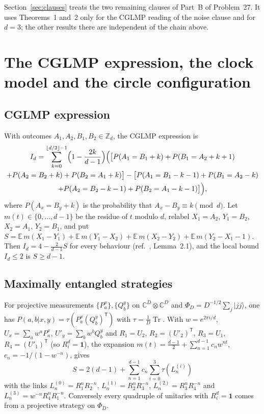 \documentclass[11pt]{amsart}
\theoremstyle{definition}
\theoremstyle{remark}
\numberwithin{equation}{section}
\newcommand{\C}{\mathbb{C}}
\newcommand{\Z}{\mathbb{Z}}
\newcommand{\Tr}{\operatorname{Tr}}
\newcommand{\one}{\mathbf{1}}
\begin{document}
Section~\ref{sec:clauses} treats the two remaining clauses of Part~B of Problem~27. It uses Theorems~1 and~2 only for
the CGLMP reading of the noise clause and for $d=3$; the other results there are independent of the chain above.

\section{The CGLMP expression, the clock model and the circle configuration}\label{sec:reduction}

\subsection{CGLMP expression}
With outcomes $A_1,A_2,B_1,B_2\in\Z_d$, the CGLMP expression\cite{CGLMP} is
\begin{multline*}
I_d=\sum_{k=0}^{\lfloor d/2\rfloor-1}\Bigl(1-\frac{2k}{d-1}\Bigr)\Bigl(\bigl[P(A_1=B_1+k)+P(B_1=A_2+k+1)\\
+P(A_2=B_2+k)+P(B_2=A_1+k)\bigr]-\bigl[P(A_1=B_1-k-1)+P(B_1=A_2-k)\\
+P(A_2=B_2-k-1)+P(B_2=A_1-k-1)\bigr]\Bigr),
\end{multline*}
where $P(A_x=B_y+k)$ is the probability that $A_x-B_y\equiv k\pmod d$. Let $m(t)\in\{0,\dots,d-1\}$ be the residue of
$t$ modulo $d$, relabel $X_1=A_2$, $Y_1=B_2$, $X_2=A_1$, $Y_2=B_1$, and put
$S=\mathbb{E}\,m(X_1-Y_1)+\mathbb{E}\,m(Y_1-X_2)+\mathbb{E}\,m(X_2-Y_2)+\mathbb{E}\,m(Y_2-X_1-1)$. Then
$I_d=4-\frac{2}{d-1}S$ for every behaviour (ref.~\cite{classical}, Lemma~2.1), and the local bound $I_d\le2$ is
$S\ge d-1$.

\subsection{Maximally entangled strategies}
For projective measurements $\{P^x_a\},\{Q^y_b\}$ on $\C^D\otimes\C^D$ and $\Phi_D=D^{-1/2}\sum_j|jj\rangle$, one has
$P(a,b|x,y)=\tau(P^x_a(Q^y_b)^{\mathsf T})$ with $\tau=\frac1D\Tr$. With $w=e^{2\pi i/d}$, $U_x=\sum_aw^aP^x_a$,
$U'_y=\sum_bw^bQ^y_b$ and $R_1=U_2$, $R_2=(U'_2)^{\mathsf T}$, $R_3=U_1$, $R_4=(U'_1)^{\mathsf T}$ (so $R_i^d=\one$),
the expansion $m(t)=\frac{d-1}{2}+\sum_{n=1}^{d-1}c_nw^{nt}$, $c_n=-1/(1-w^{-n})$, gives
\begin{equation}\label{eq:Strace}
S=2(d-1)+\sum_{n=1}^{d-1}c_n\sum_{i=0}^3\tau(L^{(i)}_n)
\end{equation}
with the links $L^{(0)}_n=R_1^nR_2^{-n}$, $L^{(1)}_n=R_2^nR_3^{-n}$, $L^{(2)}_n=R_3^nR_4^{-n}$ and
$L^{(3)}_n=w^{-n}R_4^nR_1^{-n}$.
Conversely every quadruple of unitaries with $R_i^d=\one$ comes from a projective strategy on $\Phi_D$.
\end{document}

